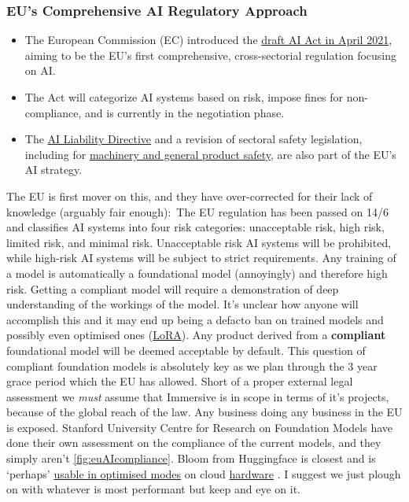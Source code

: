 \subsubsection{EU's Comprehensive AI Regulatory Approach}
\begin{itemize}
\item The European Commission (EC) introduced the \href{https://digital-strategy.ec.europa.eu/en/policies/regulatory-framework-ai}{draft AI Act in April 2021}, aiming to be the EU's first comprehensive, cross-sectorial regulation focusing on AI.
\item The Act will categorize AI systems based on risk, impose fines for non-compliance, and is currently in the negotiation phase.
\item The \href{https://commission.europa.eu/business-economy-euro/doing-business-eu/contract-rules/digital-contracts/liability-rules-artificial-intelligence_en}{AI Liability Directive} and a revision of sectoral safety legislation, including for \href{https://law.stanford.edu/publications/machine-learning-eu-data-sharing-practices/}{machinery and general product safety}, are also part of the EU's AI strategy.
\end{itemize}

The EU is first mover on this, and they have over-corrected for their lack of knowledge (arguably fair enough):\
The EU regulation has been passed on 14/6 and classifies AI systems into four risk categories: unacceptable risk, high risk, limited risk, and minimal risk. Unacceptable risk AI systems will be prohibited, while high-risk AI systems will be subject to strict requirements. Any training of a model is automatically a foundational model (annoyingly) and therefore high risk. Getting a compliant model will require a demonstration of deep understanding of the workings of the model. It's unclear how anyone will accomplish this and it may end up being a defacto ban on trained models and possibly even optimised ones (\hyperref[sec:LoRA]{LoRA}). Any product derived from a \textbf{compliant} foundational model will be deemed acceptable by default. This question of compliant foundation models is absolutely key as we plan through the 3 year grace period which the EU has allowed. Short of a proper external legal assessment we \textit{must} assume that Immersive is in scope in terms of it's projects, because of the global reach of the law. Any business doing any business in the EU is exposed. Stanford University Centre for Research on Foundation Models have done their own assessment on the compliance of the current models, and they simply aren't \ref{fig:euAIcompliance}. Bloom from Huggingface is closest and is `perhaps' \href{https://huggingface.co/BelleGroup/BELLE_BLOOM_GPTQ_4BIT}{usable in optimised modes} on cloud \href{https://lambdalabs.com/nvidia-h100-gpus}{hardware} \cite{dettmers2022case}. I suggest we just plough on with whatever is most performant but keep and eye on it.


